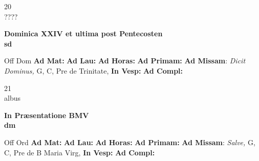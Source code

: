 \documentclass[10pt, openany]{book}
\begin{document}
    \begin{center}
        \begin{minipage}{3.5in}
            \vspace{2em}
            \begin{minipage}{0.5in}
                {\Huge 20} \\
                {\normalsize ????}
            \end{minipage}
            \begin{minipage}{3.0in}
                \textbf{ \large Dominica XXIV et ultima post Pentecosten \\
                \textnormal{\normalsize sd}}

            \end{minipage}
            \begin{justify}Off Dom
                \textbf{Ad Mat: }
                \textbf{Ad Lau: }
                \textbf{Ad Horas: }
                \textbf{Ad Primam: }\textbf{Ad Missam}: \textit{Dicit Dominus,} G, C, Pre de Trinitate, 
                \textbf{In Vesp: }
                \textbf{Ad Compl: }
            \end{justify}
        \end{minipage}
    \end{center}

    \begin{center}
        \begin{minipage}{3.5in}
            \vspace{2em}
            \begin{minipage}{0.5in}
                {\Huge 21} \\
                {\normalsize albus}
            \end{minipage}
            \begin{minipage}{3.0in}
                \textbf{ \large In Præsentatione BMV \\
                \textnormal{\normalsize dm}}

            \end{minipage}
            \begin{justify}Off Ord
                \textbf{Ad Mat: }
                \textbf{Ad Lau: }
                \textbf{Ad Horas: }
                \textbf{Ad Primam: }\textbf{Ad Missam}: \textit{Salve,} G, C, Pre de B Maria Virg, 
                \textbf{In Vesp: }
                \textbf{Ad Compl: }
            \end{justify}
        \end{minipage}
    \end{center}
\end{document}
